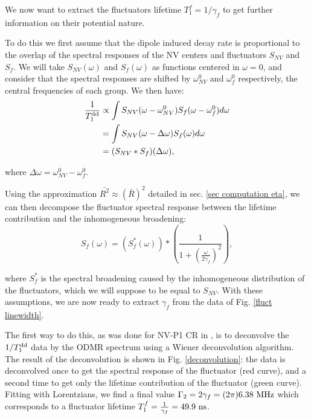 \documentclass[a4paper,11pt]{report}
\begin{document}
We now want to extract the fluctuators lifetime $T_1^f=1/\gamma_f$ to get further information on their potential nature. 

To do this we first assume that the dipole induced decay rate is proportional to the overlap of the spectral responses of the NV centers and fluctuators $S_{NV}$ and $S_f$. We will take $S_{NV}( \omega)$ and $S_{f}( \omega)$ as functions centered in $\omega=0$, and consider that the spectral responses are shifted by $\omega^0_{NV}$ and $\omega^0_{f}$ respectively, the central frequencies of each group. We then have:
\begin{align*}
\frac{1}{T_1^{\rm dd}} &\propto \int S_{NV} (\omega-\omega_{NV}^0) S_f (\omega-\omega_{f}^0) d\omega \\
&= \int S_{NV} (\omega-\Delta \omega) S_f (\omega)
 d\omega \\
 &= (S_{NV}*S_{f})(\Delta \omega),
\end{align*}

where $\Delta \omega=\omega_{NV}^0-\omega_{f}^0$.

Using the approximation $\bar {R ^2} \approx (\bar{R})^2$ detailed in sec. \ref{sec computation eta}, we can then decompose the fluctuator spectral response between the lifetime contribution and the inhomogeneous broadening:
\begin{equation}
S_{f}(\omega)=\left(S_f^*(\omega)\right)*\left(\frac{1}{1+\left(\frac{\omega}{2 \gamma_f}\right)^2} \right),
\end{equation}

where $S_f^*$ is the spectral broadening caused by the inhomogeneous distribution of the fluctuators, which we will suppose to be equal to $S_{NV}$. With these assumptions, we are now ready to extract $\gamma_f$ from the data of Fig. \ref{fluct linewidth}.

The first way to do this, as was done for NV-P1 CR in \citep{hall2016detection}, is to deconvolve the $1/T_1^{\rm dd}$ data by the ODMR spectrum using a Wiener deconvolution algorithm. The result of the deconvolution is shown in Fig. \ref{deconvolution}: the data is deconvolved once to get the spectral response of the fluctuator (red curve), and a second time to get only the lifetime contribution of the fluctuator (green curve). Fitting with Lorentzians, we find a final value $\Gamma_2 =2\gamma_f= (2\pi) 6.38\ \rm MHz$ which corresponds to a fluctuator lifetime $T_1^f=\frac{1}{\gamma_f}=49.9\ \rm ns$.
\end{document}
